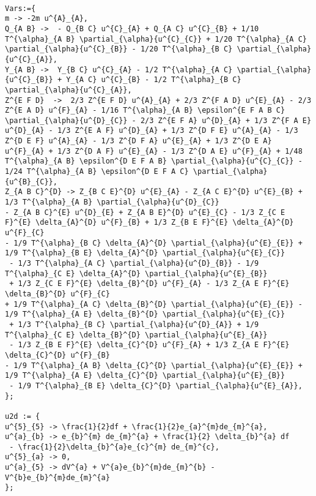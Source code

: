 \documentclass[11pt]{article}
\begin{document}
\\
{\color[named]{Blue}\begin{verbatim}
Vars:={
m -> -2m u^{A}_{A},
Q_{A B} ->  - Q_{B C} u^{C}_{A} + Q_{A C} u^{C}_{B} + 1/10 T^{\alpha}_{A B} \partial_{\alpha}{u^{C}_{C}} + 1/20 T^{\alpha}_{A C} \partial_{\alpha}{u^{C}_{B}} - 1/20 T^{\alpha}_{B C} \partial_{\alpha}{u^{C}_{A}},
Y_{A B} ->  Y_{B C} u^{C}_{A} - 1/2 T^{\alpha}_{A C} \partial_{\alpha}{u^{C}_{B}} + Y_{A C} u^{C}_{B} - 1/2 T^{\alpha}_{B C} \partial_{\alpha}{u^{C}_{A}},
Z^{E F D}  ->  2/3 Z^{E F D} u^{A}_{A} + 2/3 Z^{F A D} u^{E}_{A} - 2/3 Z^{E A D} u^{F}_{A} - 1/16 T^{\alpha}_{A B} \epsilon^{E F A B C} \partial_{\alpha}{u^{D}_{C}} - 2/3 Z^{E F A} u^{D}_{A} + 1/3 Z^{F A E} u^{D}_{A} - 1/3 Z^{E A F} u^{D}_{A} + 1/3 Z^{D F E} u^{A}_{A} - 1/3 Z^{D E F} u^{A}_{A} - 1/3 Z^{D F A} u^{E}_{A} + 1/3 Z^{D E A} u^{F}_{A} + 1/3 Z^{D A F} u^{E}_{A} - 1/3 Z^{D A E} u^{F}_{A} + 1/48 T^{\alpha}_{A B} \epsilon^{D E F A B} \partial_{\alpha}{u^{C}_{C}} - 1/24 T^{\alpha}_{A B} \epsilon^{D E F A C} \partial_{\alpha}{u^{B}_{C}},
Z_{A B C}^{D} -> Z_{B C E}^{D} u^{E}_{A} - Z_{A C E}^{D} u^{E}_{B} + 1/3 T^{\alpha}_{A B} \partial_{\alpha}{u^{D}_{C}} 
- Z_{A B C}^{E} u^{D}_{E} + Z_{A B E}^{D} u^{E}_{C} - 1/3 Z_{C E F}^{E} \delta_{A}^{D} u^{F}_{B} + 1/3 Z_{B E F}^{E} \delta_{A}^{D} u^{F}_{C} 
- 1/9 T^{\alpha}_{B C} \delta_{A}^{D} \partial_{\alpha}{u^{E}_{E}} + 1/9 T^{\alpha}_{B E} \delta_{A}^{D} \partial_{\alpha}{u^{E}_{C}}
 - 1/3 T^{\alpha}_{A C} \partial_{\alpha}{u^{D}_{B}} - 1/9 T^{\alpha}_{C E} \delta_{A}^{D} \partial_{\alpha}{u^{E}_{B}}
 + 1/3 Z_{C E F}^{E} \delta_{B}^{D} u^{F}_{A} - 1/3 Z_{A E F}^{E} \delta_{B}^{D} u^{F}_{C} 
+ 1/9 T^{\alpha}_{A C} \delta_{B}^{D} \partial_{\alpha}{u^{E}_{E}} - 1/9 T^{\alpha}_{A E} \delta_{B}^{D} \partial_{\alpha}{u^{E}_{C}}
 + 1/3 T^{\alpha}_{B C} \partial_{\alpha}{u^{D}_{A}} + 1/9 T^{\alpha}_{C E} \delta_{B}^{D} \partial_{\alpha}{u^{E}_{A}}
 - 1/3 Z_{B E F}^{E} \delta_{C}^{D} u^{F}_{A} + 1/3 Z_{A E F}^{E} \delta_{C}^{D} u^{F}_{B} 
- 1/9 T^{\alpha}_{A B} \delta_{C}^{D} \partial_{\alpha}{u^{E}_{E}} + 1/9 T^{\alpha}_{A E} \delta_{C}^{D} \partial_{\alpha}{u^{E}_{B}}
 - 1/9 T^{\alpha}_{B E} \delta_{C}^{D} \partial_{\alpha}{u^{E}_{A}},
};

u2d := {
u^{5}_{5} -> \frac{1}{2}df + \frac{1}{2}e_{a}^{m}de_{m}^{a},
u^{a}_{b} -> e_{b}^{m} de_{m}^{a} + \frac{1}{2} \delta_{b}^{a} df
 - \frac{1}{2}\delta_{b}^{a}e_{c}^{m} de_{m}^{c},
u^{5}_{a} -> 0,
u^{a}_{5} -> dV^{a} + V^{a}e_{b}^{m}de_{m}^{b} - V^{b}e_{b}^{m}de_{m}^{a}
};


\end{verbatim}}
\end{document}
